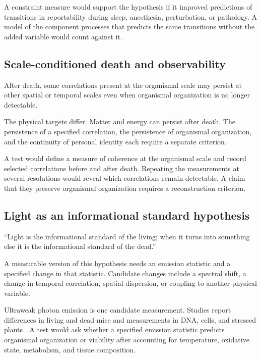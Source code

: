 A constraint measure would support the hypothesis if it improved predictions of transitions in reportability during sleep, anesthesia, perturbation, or pathology. A model of the component processes that predicts the same transitions without the added variable would count against it.

\subsection{Scale-conditioned death and observability}

\begin{hypothesis}
After death, some correlations present at the organismal scale may persist at other spatial or temporal scales even when organismal organization is no longer detectable.
\end{hypothesis}
The physical targets differ. Matter and energy can persist after death. The persistence of a specified correlation, the persistence of organismal organization, and the continuity of personal identity each require a separate criterion.

A test would define a measure of coherence at the organismal scale and record selected correlations before and after death. Repeating the measurements at several resolutions would reveal which correlations remain detectable. A claim that they preserve organismal organization requires a reconstruction criterion.

\subsection{Light as an informational standard hypothesis}

\begin{hypothesis}
``Light is the informational standard of the living; when it turns into something else it is the informational standard of the dead.''
\end{hypothesis}
A measurable version of this hypothesis needs an emission statistic and a specified change in that statistic. Candidate changes include a spectral shift, a change in temporal correlation, spatial dispersion, or coupling to another physical variable.

Ultraweak photon emission is one candidate measurement. Studies report differences in living and dead mice and measurements in DNA, cells, and stressed plants \parencite{PietruszkaMarzec2024,Salari2025,Mould2024}. A test would ask whether a specified emission statistic predicts organismal organization or viability after accounting for temperature, oxidative state, metabolism, and tissue composition.

